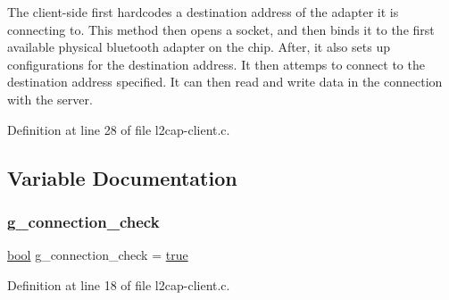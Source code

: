The client-\/side first hardcodes a destination address of the adapter it is connecting to. This method then opens a socket, and then binds it to the first available physical bluetooth adapter on the chip. After, it also sets up configurations for the destination address. It then attemps to connect to the destination address specified. It can then read and write data in the connection with the server. 

Definition at line 28 of file l2cap-\/client.\+c.



\subsection{Variable Documentation}
\mbox{\label{tcpserver_2l2cap-client_8c_a81bc6941c354c1be6ad9931b4f2b50bf}} 
\subsubsection{\texorpdfstring{g\+\_\+connection\+\_\+check}{g\_connection\_check}}
{\footnotesize\ttfamily \mbox{\hyperlink{piconet_2l2cap-client_8c_af6a258d8f3ee5206d682d799316314b1}{bool}} g\+\_\+connection\+\_\+check = \mbox{\hyperlink{tcpserver_2l2cap-client_8c_af6a258d8f3ee5206d682d799316314b1a08f175a5505a10b9ed657defeb050e4b}{true}}}



Definition at line 18 of file l2cap-\/client.\+c.

